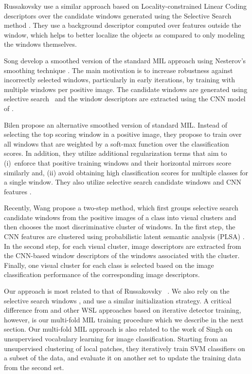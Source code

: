 \documentclass[10pt,journal,cspaper,final,twocolumn,compsoc]{./IEEEtran}
\begin{document}
Russakovsky \etal\cite{russakovsky12eccv} use a similar approach based on
Locality-constrained Linear Coding
descriptors \cite{wang10cvpr} over the candidate
windows generated using the Selective Search method 
\cite{uijlings13ijcv}.  
They use a background
descriptor computed over features outside the window,
which helps to better localize the objects as compared to
only modeling the windows themselves. 

Song \etal\cite{song14icml} develop a smoothed version of
the standard MIL approach using Nesterov's smoothing
technique \cite{nesterov05mathprog}.  The main motivation
is to increase robustness against incorrectly selected
windows, particularly in early iterations, by training
with multiple windows per positive image.  
The candidate windows are generated using selective
search~\cite{uijlings13ijcv} and the window descriptors
are extracted using the CNN model of 
\cite{krizhevsky12nips}.

Bilen \etal\cite{bilen14bmvc} propose an alternative
smoothed version of standard MIL. Instead of
selecting the top scoring window in a positive image, they
propose to train over all windows that are weighted by a
soft-max function over the classification scores. In
addition, they utilize additional regularization terms
that aim to (i)~enforce that positive training windows and
their horizontal mirrors score similarly and,
(ii) avoid obtaining high classification scores for
multiple classes for a single window. They also utilize selective search candidate
windows \cite{uijlings13ijcv} and  CNN features \cite{krizhevsky12nips}.

Recently, Wang \etal\cite{wang14eccv} propose a two-step
method, which first groups selective search candidate
windows \cite{uijlings13ijcv} from the positive images of
a class into visual clusters and then chooses the most
discriminative cluster of windows. In the first step, the CNN features \cite{krizhevsky12nips} are clustered using probabilistic
latent semantic analysis (PLSA) 
\cite{hofmann01ml}. 
In the second
step, for each visual cluster, image descriptors are extracted from the CNN-based window descriptors of the windows associated with the cluster. Finally, one visual
cluster for each class is selected based on the image
classification performance of the corresponding image
descriptors.

Our approach is most related to that of Russakovsky \etal
~\cite{russakovsky12eccv}. We also rely on the selective
search windows \cite{uijlings13ijcv}, and use a similar
initialization strategy. A critical  difference from
\cite{russakovsky12eccv} and other WSL approaches based on
iterative detector training, however, is our multi-fold
MIL training procedure which we describe in the next
section.  Our multi-fold MIL approach is also related to
the work of Singh \etal\cite{singh12eccv} on unsupervised
vocabulary learning for image classification.  Starting
from an unsupervised clustering of local patches, they
iteratively train SVM classifiers on a subset of the data,
and evaluate it on another set to update the training data
from the second set.  
\end{document}
